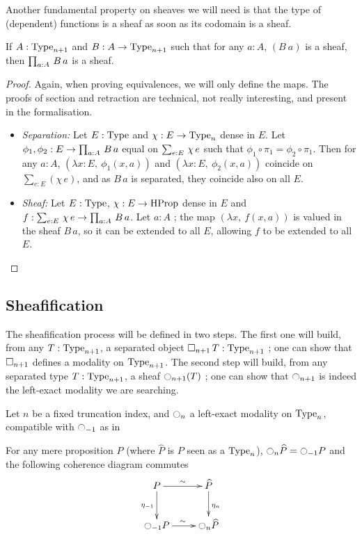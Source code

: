 Another fundamental property on sheaves we will need is that the type of (dependent)
functions is a sheaf as soon as its codomain is a sheaf.

\begin{prop}
\label{prop:sheaf-forall}
  If $A:\operatorname{Type}_{n+1}$ and $B:A \to \operatorname{Type}_{n+1}$ such that for any
  $a:A$, $(B~a)$ is a sheaf, then $\prod_{a:A}\, B\, a$ is a sheaf.
\end{prop}
\begin{proof}
  Again, when proving equivalences, we will only define the maps. The
  proofs of section and retraction are technical, not really
  interesting, and present in the formalisation.
  \begin{itemize}
  \item {\em Separation:} Let $E:\operatorname{Type}$ and $\chi:E \to \operatorname{Type}_n$ dense
    in $E$. Let $\phi_1,\phi_2:E\to \prod_{a:A}\, B\, a$ equal on
    $\sum_{e:E}\, \chi\, e$ \ie{} such that $\phi_1\circ \pi_1 = \phi_2\circ
    \pi_1$.
    Then for any $a:A$, $(\lambda x:E,~\phi_1(x, a))$
    and $(\lambda x:E,~\phi_2(x,a))$
    coincide on $\sum_{e:E}(\chi\, e)$, and as $B\, a$ is separated,
    they coincide also on all $E$.
  \item {\em Sheaf:} Let $E:\operatorname{Type}$, $\chi:E\to \operatorname{HProp}$ dense in $E$ and
    $f:\sum_{e:E}\, \chi\, e\to \prod_{a:A}\, B\,a$. Let $a:A$ ; the
    map $(\lambda x,~f(x,a))$ is valued in the sheaf $B\, a$, so it
    can be extended to all $E$, allowing $f$ to be extended to all
    $E$.
  \end{itemize}
\end{proof}

\subsection{Sheafification}
\label{ssec:sheafification}

The sheafification process will be defined in two steps. The first
one will build, from any $T:\operatorname{Type}_{n+1}$, a separated object $\mathop{\square_{n+1}}
T:\operatorname{Type}_{n+1}$ ; one can show that $\mathop{\square_{n+1}}$ defines a modality on
$\operatorname{Type}_{n+1}$. The second step will build, from any separated type
$T:\operatorname{Type}_{n+1}$, a sheaf $\ocircle_{n+1}(T)$ ; one can show that
$\ocircle_{n+1}$ is indeed the left-exact modality we are searching.

Let $n$ be a fixed truncation index, and $\ocircle_n$ a left-exact
modality on $\operatorname{Type}_n$, compatible with $\ocircle_{-1}$ as in
\begin{cond}\label{cond:hprop}
  For any mere proposition $P$ (where $\widehat P$ is $P$ seen as a
  $\operatorname{Type}_n$),  $\ocircle_n \widehat P = \ocircle_{-1} P$ and the
  following coherence diagram commutes
  \[\xymatrix{
    P \ar@{->}^{\sim}[r] \ar[d]_{\eta_{-1}} & \widehat P \ar[d]^{\eta_n} \\
    \modal_{-1} P \ar@{->}^{\sim}[r] & \modal_n \widehat P 
  }\]
\end{cond}

